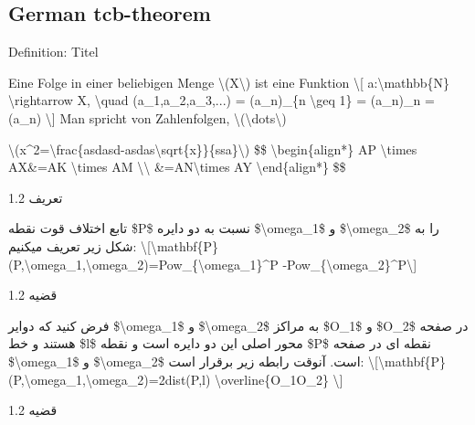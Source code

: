 \hypertarget{german-tcb-theorem}{%
\subsection{German tcb-theorem}\label{german-tcb-theorem}}

Definition: Titel

Eine Folge in einer beliebigen Menge \textbackslash(X\textbackslash) ist
eine Funktion \textbackslash{[} a:\textbackslash mathbb\{N\}
\textbackslash rightarrow X, \textbackslash quad (a\_1,a\_2,a\_3,...) =
(a\_n)\_\{n \textbackslash geq 1\} = (a\_n)\_n = (a\_n)
\textbackslash{]} Man spricht von Zahlenfolgen,
\textbackslash(\textbackslash dots\textbackslash)

\textbackslash(x\^{}2=\textbackslash frac\{asdasd-asdas\textbackslash sqrt\{x\}\}\{ssa\}\textbackslash)
\$\$ \textbackslash begin\{align*\} AP \textbackslash times AX\&=AK
\textbackslash times AM \textbackslash\textbackslash{}
\&=AN\textbackslash times AY \textbackslash end\{align*\} \$\$

تعریف 1.2

تابع اختلاف قوت نقطه \$P\$ نسبت به دو دایره \$\textbackslash omega\_1\$
و \$\textbackslash omega\_2\$ را به شکل زیر تعریف میکنیم:
\textbackslash{[}\textbackslash mathbf\{P\}(P,\textbackslash omega\_1,\textbackslash omega\_2)=Pow\_\{\textbackslash omega\_1\}\^{}P
-Pow\_\{\textbackslash omega\_2\}\^{}P\textbackslash{]}

قضیه 1.2

فرض کنید که دوایر \$\textbackslash omega\_1\$ و
\$\textbackslash omega\_2\$ به مراکز \$O\_1\$ و \$O\_2\$ در صفحه هستند و
خط \$l\$ محور اصلی این دو دایره است و نقطه \$P\$ نقطه ای در صفحه
\$\textbackslash omega\_1\$ و \$\textbackslash omega\_2\$ است. آنوقت
رابطه زیر برقرار است:
\textbackslash{[}\textbackslash mathbf\{P\}(P,\textbackslash omega\_1,\textbackslash omega\_2)=2dist(P,l)
\textbackslash overline\{O\_1O\_2\} \textbackslash{]}

قضیه 1.2

